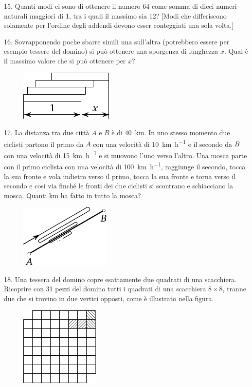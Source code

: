 \begin{problem}{15.}
	Quanti modi ci sono di ottenere il numero 64 come somma di dieci numeri naturali maggiori di 1, tra i quali il massimo sia 12?  [Modi che differiscono solamente per l’ordine degli addendi devono esser conteggiati una sola volta.]
\end{problem}

\begin{problem}{16.}
	Sovrapponendo poche sbarre simili una sull’altra (potrebbero essere per esempio tessere del domino) si può ottenere una sporgenza di lunghezza $x$. Qual è il massimo valore che si può ottenere per $x$?
	\begin{figure}
		\includegraphics{resources/taskbook-97}
	\end{figure}
\end{problem}

\begin{problem}{17.}
	La distanza tra due città $A$ e $B$ è di \SI{40}{\km}. In uno stesso momento due ciclisti partono il primo da $A$ con una velocità di \SI{10}{\km\per\hour} e il secondo da $B$ con una velocità di  \SI{15}{\km\per\hour} e si muovono l'uno verso l'altro. Una mosca parte con il primo ciclista con una velocità di \SI{100}{\km\per\hour}, raggiunge il secondo, tocca la sua fronte e vola indietro verso il primo, tocca la sua fronte e torna verso il secondo e così via finché le fronti dei due ciclisti si scontrano e schiacciano la mosca. Quanti km ha fatto in tutto la mosca?
	\begin{figure}
		\includegraphics{resources/taskbook-1}
	\end{figure}
\end{problem}

\begin{problem}{18.}
	Una tessera del domino copre esattamente due quadrati di una scacchiera. Ricoprire con 31 pezzi del domino tutti i quadrati di una scacchiera  $8 \times 8$, tranne due che si trovino in due vertici opposti, come è illustrato nella figura.
	\begin{figure}
		\includegraphics{resources/taskbook-2}
	\end{figure}
\end{problem}

